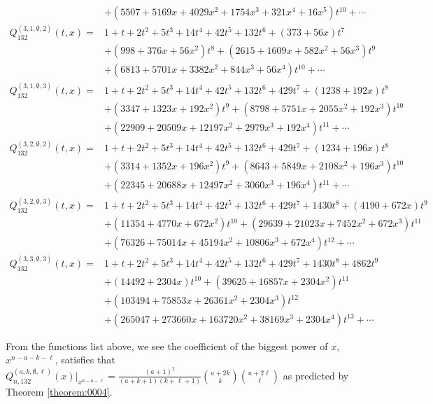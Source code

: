 \documentclass[
final,nomarks
]{dmtcs-episciences}
\newcommand{\tref}[1]{Theorem \ref{theorem:#1}}
\newcommand{\Qmm}[1]{Q_{132}^{(#1)}(t,x)}
\newcommand{\Qmmn}[2]{Q_{#2,132}^{(#1)}(x)}
\begin{document}
\begin{align}
&+\left(5507+5169 x+4029 x^2+1754 x^3+321 x^4+16
x^5\right) t^{10}+\cdots
\\
\Qmm{3,1,\emptyset,2}=&1+t+2 t^2+5 t^3+14 t^4+42 t^5+132 t^6+(373+56 x) t^7\nonumber\\\nonumber
&+\left(998+376 x+56
x^2\right) t^8+\left(2615+1609 x+582 x^2+56 x^3\right) t^9\\
&+\left(6813+5701
x+3382 x^2+844 x^3+56 x^4\right) t^{10}+\cdots
\\
\Qmm{3,1,\emptyset,3}=&1+t+2 t^2+5 t^3+14 t^4+42 t^5+132 t^6+429 t^7+(1238+192 x) t^8\nonumber\\\nonumber
&+\left(3347+1323
x+192 x^2\right) t^9+\left(8798+5751 x+2055 x^2+192 x^3\right)
t^{10}\\
&+\left(22909+20509 x+12197 x^2+2979 x^3+192 x^4\right)
t^{11}+\cdots
\\
\Qmm{3,2,\emptyset,2}=&1+t+2 t^2+5 t^3+14 t^4+42 t^5+132 t^6+429 t^7+(1234+196 x) t^8\nonumber\\\nonumber
&+\left(3314+1352
x+196 x^2\right) t^9+\left(8643+5849 x+2108 x^2+196 x^3\right)
t^{10}\\
&+\left(22345+20688 x+12497 x^2+3060 x^3+196 x^4\right)
t^{11}+\cdots
\\
\Qmm{3,2,\emptyset,3}=&1+t+2 t^2+5 t^3+14 t^4+42 t^5+132 t^6+429 t^7+1430 t^8+(4190+672 x)
t^9\nonumber\\\nonumber
&+\left(11354+4770 x+672 x^2\right) t^{10}+\left(29639+21023 x+7452
x^2+672 x^3\right) t^{11}\\
&+\left(76326+75014 x+45194 x^2+10806 x^3+672
x^4\right) t^{12}+\cdots
\end{align}
\begin{align}
\Qmm{3,3,\emptyset,3}=&1+t+2 t^2+5 t^3+14 t^4+42 t^5+132 t^6+429 t^7+1430 t^8+4862 t^9\nonumber\\\nonumber
&+(14492+2304 x)
t^{10}+\left(39625+16857 x+2304 x^2\right) t^{11}\\\nonumber
&+\left(103494+75853 x+26361
x^2+2304 x^3\right) t^{12}\\
&+\left(265047+273660 x+163720 x^2+38169 x^3+2304
x^4\right) t^{13}+\cdots
\end{align}

From the functions list above, we see the coefficient of the biggest power of \begin{math}x\end{math}, \begin{math}x^{n-a-k-\ell}\end{math}, satisfies that \begin{math}\Qmmn{a,k,\emptyset,\ell}{n}\big\vert_{x^{n-a-\ell}}=\frac{(a+1)^2}{(a+k+1)(k+\ell+1)}\binom{a+2k}{k}\binom{a+2\ell}{\ell}\end{math} as predicted by \tref{0004}.
\end{document}

